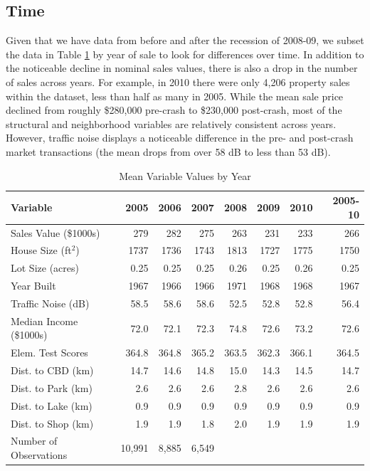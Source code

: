 \documentclass{article}\usepackage{graphicx, color}
\begin{document}
\subsection{Time}
Given that we have data from before and after the recession of 2008-09, we subset the data in Table \ref{tab:SumStatsTime} by year of sale to look for differences over time. In addition to the noticeable decline in nominal sales values, there is also a drop in the number of sales across years. For example, in 2010 there were only 4,206 property sales within the dataset, less than half as many in 2005. While the mean sale price declined from roughly \$280,000 pre-crash to \$230,000 post-crash, most of the structural and neighborhood variables are relatively consistent across years. However, traffic noise displays a noticeable difference in the pre- and post-crash market transactions (the mean drops from over 58 dB to less than 53 dB). 

\begin{table}
\begin{center}
\caption{Mean Variable Values by Year}\label{tab:SumStatsTime}
\small
    \begin{tabular}{lrrrrrr|r}
    Variable & 2005 & 2006 & 2007 & 2008 & 2009 & 2010 & 2005-10\\ \hline
    Sales Value (\$1000s) & 279   & 282   & 275   & 263   & 231   & 233   & 266 \\
    House Size (ft$^2$) & 1737  & 1736  & 1743  & 1813  & 1727  & 1775  & 1750 \\
    Lot Size (acres) & 0.25  & 0.25  & 0.25  & 0.26  & 0.25  & 0.26  & 0.25 \\
    Year Built  & 1967  & 1966  & 1966  & 1971  & 1968  & 1968  & 1967 \\
    Traffic Noise (dB) & 58.5  & 58.6  & 58.6  & 52.5  & 52.8  & 52.8  & 56.4 \\
    Median Income (\$1000s) & 72.0  & 72.1  & 72.3  & 74.8  & 72.6  & 73.2  & 72.6 \\
    Elem. Test Scores & 364.8 & 364.8 & 365.2 & 363.5 & 362.3 & 366.1 & 364.5 \\
    Dist. to CBD (km) & 14.7  & 14.6  & 14.8  & 15.0  & 14.3  & 14.5  & 14.7 \\
    Dist. to Park (km) & 2.6   & 2.6   & 2.6   & 2.8   & 2.6   & 2.6   & 2.6 \\
    Dist. to Lake (km) & 0.9   & 0.9   & 0.9   & 0.9   & 0.9   & 0.9   & 0.9 \\
    Dist. to Shop (km) & 1.9   & 1.9   & 1.8   & 2.0   & 1.9   & 1.9   & 1.9 \\ \hline
    Number of Observations &  10,991  & 8,885  &  6,549  &
    \end{tabular}%
\end{center}
\end{table}
\end{document}
